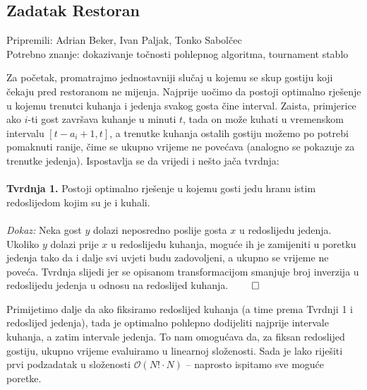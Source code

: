 \subsection*{Zadatak Restoran}
\textsf{Pripremili: Adrian Beker, Ivan Paljak, Tonko Sabolčec}\\
\textsf{Potrebno znanje: dokazivanje točnosti pohlepnog algoritma, tournament stablo}

Za početak, promatrajmo jednostavniji slučaj u kojemu se skup gostiju koji čekaju pred restoranom ne mijenja. Najprije uočimo da postoji optimalno rješenje u kojemu trenutci kuhanja i jedenja svakog gosta čine interval. Zaista, primjerice ako $i$-ti gost završava kuhanje u minuti $t$, tada on može kuhati u vremenskom intervalu $[t - a_i + 1, t]$, a trenutke kuhanja ostalih gostiju možemo po potrebi pomaknuti ranije, čime se ukupno vrijeme ne povećava (analogno se pokazuje za trenutke jedenja). Ispostavlja se da vrijedi i nešto jača tvrdnja:
\\\\
\textbf{Tvrdnja 1.} Postoji optimalno rješenje u kojemu gosti jedu hranu istim redoslijedom kojim su je i kuhali.
\\\\
\textit{Dokaz:} Neka gost $y$ dolazi neposredno poslije gosta $x$ u redoslijedu jedenja. Ukoliko $y$ dolazi prije $x$ u redoslijedu kuhanja, moguće ih je zamijeniti u poretku jedenja tako da i dalje svi uvjeti budu zadovoljeni, a ukupno se vrijeme ne poveća. Tvrdnja slijedi jer se opisanom transformacijom smanjuje broj inverzija u redoslijedu jedenja u odnosu na redoslijed kuhanja. $\qed$

Primijetimo dalje da ako fiksiramo redoslijed kuhanja (a time prema Tvrdnji 1 i redoslijed jedenja), tada je optimalno pohlepno dodijeliti najprije intervale kuhanja, a zatim intervale jedenja. To nam omogućava da, za fiksan redoslijed gostiju, ukupno vrijeme evaluiramo u linearnoj složenosti. Sada je lako riješiti prvi podzadatak u složenosti $\mathcal{O}(N! \cdot N)$ -- naprosto ispitamo sve moguće poretke.

